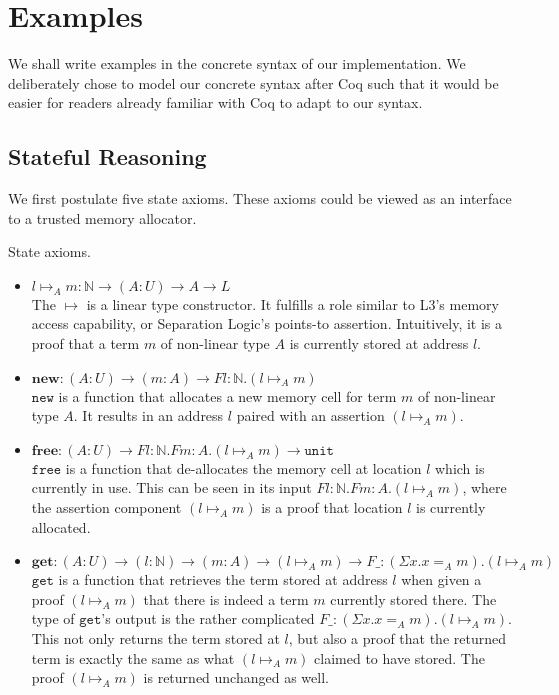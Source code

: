 \documentclass[sigplan,screen,review,anonymous]{acmart}
\newcommand{\unit}{\texttt{unit}}
\newcommand{\new}{\texttt{new}}
\newcommand{\free}{\texttt{free}}
\newcommand{\get}{\texttt{get}}
\begin{document}
\section{Examples}\label{examples}
We shall write examples in the concrete syntax of our implementation. We deliberately chose to model our concrete syntax after Coq such that it would be easier for readers already familiar with Coq to adapt to our syntax.

\subsection{Stateful Reasoning}
We first postulate five state axioms. These axioms could be viewed as an interface to a trusted memory allocator.
\begin{definition}
  State axioms.
  \begin{itemize}
    \item $l \mapsto_A m : \mathbb{N} \rightarrow (A : U) \rightarrow A \rightarrow L$ \\
          The $\mapsto$ is a linear type constructor. It fulfills a role similar to L3's \cite{l3} memory access capability, or Separation Logic's \cite{reynolds02} points-to assertion. Intuitively, it is a proof that a term $m$ of non-linear type $A$ is currently stored at address $l$.
    \item $\textbf{new} : (A : U) \rightarrow (m : A) \rightarrow F l:\mathbb{N}.(l \mapsto_A m)$ \\
          $\new$ is a function that allocates a new memory cell for term $m$ of non-linear type $A$. It results in an address $l$ paired with an assertion $(l \mapsto_A m)$.
    \item $\textbf{free} : (A : U) \rightarrow F l:\mathbb{N}.F m:A.(l \mapsto_A m) \rightarrow \unit$ \\
          $\free$ is a function that de-allocates the memory cell at location $l$ which is currently in use. This can be seen in its input $F l:\mathbb{N}.F m:A.(l \mapsto_A m)$, where the assertion component $(l \mapsto_A m)$ is a proof that location $l$ is currently allocated.
    \item $\textbf{get} : (A : U) \rightarrow (l : \mathbb{N}) \rightarrow (m : A) \rightarrow (l \mapsto_A m) \rightarrow F \_: (\Sigma x. x =_A m). (l \mapsto_A m)$ \\
          $\get$ is a function that retrieves the term stored at address $l$ when given a proof $(l \mapsto_A m)$ that there is indeed a term $m$ currently stored there. The type of $\get$'s output is the rather complicated $F \_: (\Sigma x. x =_A m). (l \mapsto_A m)$. This not only returns the term stored at $l$, but also a proof that the returned term is exactly the same as what $(l \mapsto_A m)$ claimed to have stored. The proof $(l \mapsto_A m)$ is returned unchanged as well.

\end{itemize}
\end{definition}
\end{document}
